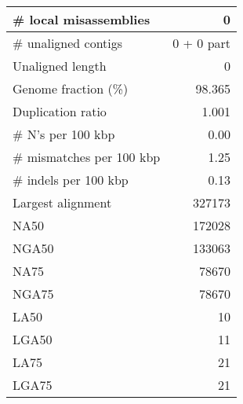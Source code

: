 \documentclass[12pt,a4paper]{article}
\begin{document}
\begin{table}[ht]
\begin{center}
\begin{tabular}{|l*{1}{|r}|}
\# local misassemblies & 0 \\ \hline
\# unaligned contigs & 0 + 0 part \\ \hline
Unaligned length & 0 \\ \hline
Genome fraction (\%) & 98.365 \\ \hline
Duplication ratio & 1.001 \\ \hline
\# N's per 100 kbp & 0.00 \\ \hline
\# mismatches per 100 kbp & 1.25 \\ \hline
\# indels per 100 kbp & 0.13 \\ \hline
Largest alignment & 327173 \\ \hline
NA50 & 172028 \\ \hline
NGA50 & 133063 \\ \hline
NA75 & 78670 \\ \hline
NGA75 & 78670 \\ \hline
LA50 & 10 \\ \hline
LGA50 & 11 \\ \hline
LA75 & 21 \\ \hline
LGA75 & 21 \\ \hline
\end{tabular}
\end{center}
\end{table}
\end{document}
